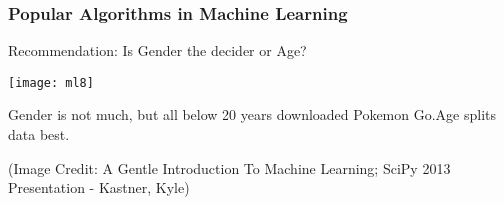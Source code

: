 
\begin{frame}[fragile]\frametitle{Popular Algorithms in Machine Learning}
Recommendation: Is Gender the decider or Age?
\begin{center}
\texttt{[image: ml8]}
\end{center}
Gender is not much, but all below 20 years downloaded Pokemon Go.Age splits data best.

\tiny{(Image Credit: A Gentle Introduction To Machine Learning; SciPy 2013 Presentation - Kastner, Kyle)}
\end{frame}

